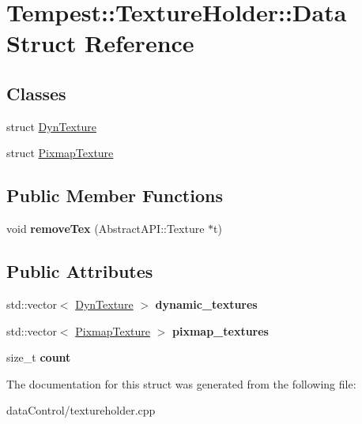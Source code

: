 \hypertarget{struct_texture_holder_1_1_data}{\section{Tempest\+:\+:Texture\+Holder\+:\+:Data Struct Reference}
\label{struct_texture_holder_1_1_data}
}
\subsection*{Classes}
\begin{DoxyCompactItemize}
\item 
struct \hyperlink{struct_texture_holder_1_1_data_1_1_dyn_texture}{Dyn\+Texture}
\item 
struct \hyperlink{struct_texture_holder_1_1_data_1_1_pixmap_texture}{Pixmap\+Texture}
\end{DoxyCompactItemize}
\subsection*{Public Member Functions}
\begin{DoxyCompactItemize}
\item 
\hypertarget{struct_texture_holder_1_1_data_a4e1dcbfa0aac476a979ec1c58edb1655}{void {\bfseries remove\+Tex} (Abstract\+A\+P\+I\+::\+Texture $\ast$t)}\label{struct_texture_holder_1_1_data_a4e1dcbfa0aac476a979ec1c58edb1655}

\end{DoxyCompactItemize}
\subsection*{Public Attributes}
\begin{DoxyCompactItemize}
\item 
\hypertarget{struct_texture_holder_1_1_data_a06c83385574f7da8ae9afd022a7000e9}{std\+::vector$<$ \hyperlink{struct_texture_holder_1_1_data_1_1_dyn_texture}{Dyn\+Texture} $>$ {\bfseries dynamic\+\_\+textures}}\label{struct_texture_holder_1_1_data_a06c83385574f7da8ae9afd022a7000e9}

\item 
\hypertarget{struct_texture_holder_1_1_data_a4ae87cab1aae94aa7f7837eee436e051}{std\+::vector$<$ \hyperlink{struct_texture_holder_1_1_data_1_1_pixmap_texture}{Pixmap\+Texture} $>$ {\bfseries pixmap\+\_\+textures}}\label{struct_texture_holder_1_1_data_a4ae87cab1aae94aa7f7837eee436e051}

\item 
\hypertarget{struct_texture_holder_1_1_data_a78565853ba4600957371d5c104f6ee6a}{size\+\_\+t {\bfseries count}}\label{struct_texture_holder_1_1_data_a78565853ba4600957371d5c104f6ee6a}

\end{DoxyCompactItemize}


The documentation for this struct was generated from the following file\+:\begin{DoxyCompactItemize}
\item 
data\+Control/textureholder.\+cpp\end{DoxyCompactItemize}
